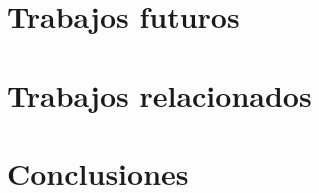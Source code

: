 \documentclass[12pt, oneside]{book}
\begin{document}
\chapter{Trabajos futuros}


\chapter{Trabajos relacionados}


\chapter{Conclusiones}


\clearpage


\end{document}
